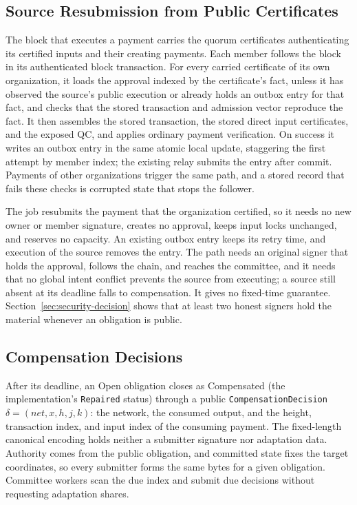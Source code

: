 \subsection{Source Resubmission from Public Certificates}
\label{sec:protocol-resubmission}

The block that executes a payment carries the quorum certificates authenticating its certified inputs and their creating payments. Each member follows the block in its authenticated block transaction. For every carried certificate of its own organization, it loads the approval indexed by the certificate's fact, unless it has observed the source's public execution or already holds an outbox entry for that fact, and checks that the stored transaction and admission vector reproduce the fact. It then assembles the stored transaction, the stored direct input certificates, and the exposed QC, and applies ordinary payment verification. On success it writes an outbox entry in the same atomic local update, staggering the first attempt by member index; the existing relay submits the entry after commit. Payments of other organizations trigger the same path, and a stored record that fails these checks is corrupted state that stops the follower.

The job resubmits the payment that the organization certified, so it needs no new owner or member signature, creates no approval, keeps input locks unchanged, and reserves no capacity. An existing outbox entry keeps its retry time, and execution of the source removes the entry. The path needs an original signer that holds the approval, follows the chain, and reaches the committee, and it needs that no global intent conflict prevents the source from executing; a source still absent at its deadline falls to compensation. It gives no fixed-time guarantee. Section~\ref{sec:security-decision} shows that at least two honest signers hold the material whenever an obligation is public.
\subsection{Compensation Decisions}
\label{sec:protocol-decision}

After its deadline, an Open obligation closes as Compensated (the implementation's \texttt{Repaired} status) through a public \texttt{CompensationDecision} $\delta=(\mathit{net},x,h,j,k)$: the network, the consumed output, and the height, transaction index, and input index of the consuming payment. The fixed-length canonical encoding holds neither a submitter signature nor adaptation data. Authority comes from the public obligation, and committed state fixes the target coordinates, so every submitter forms the same bytes for a given obligation. Committee workers scan the due index and submit due decisions without requesting adaptation shares.

